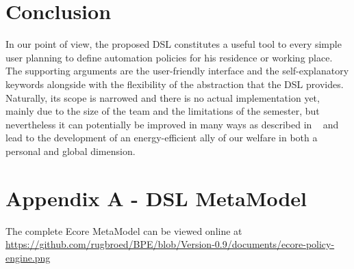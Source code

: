 \documentclass{llncs}
\begin{document}
\section{Conclusion}\label{sec:conclusion}
In our point of view, the proposed DSL constitutes a useful tool to every simple user planning to define automation policies for his residence or working place. The supporting arguments are the user-friendly interface and the self-explanatory keywords alongside with the flexibility of the abstraction that the DSL provides. Naturally, its scope is narrowed and there is no actual implementation yet, mainly due to the size of the team and the limitations of the semester, but nevertheless it can potentially be improved in many ways as described in ~ and lead to the development of an energy-efficient ally of our welfare in both a personal and global dimension. 

{}


\section{Appendix A - DSL MetaModel}
The complete Ecore MetaModel can be viewed online at
\url{https://github.com/rugbroed/BPE/blob/Version-0.9/documents/ecore-policy-engine.png}






\end{document}
